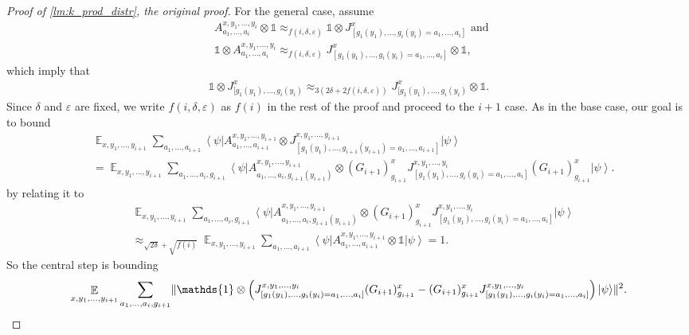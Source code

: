 \documentclass[10pt,a4paper]{article}
\theoremstyle{plain}
\theoremstyle{definition}
\DeclarePairedDelimiter{\norm}{\lVert}{\rVert}
\newcommand {\bra} [1] {\ensuremath{ \left\langle #1 \right| }}
\newcommand {\ket} [1] {\ensuremath{ \left| #1 \right\rangle }}
\DeclareMathOperator*{\bigE}{\mathbb{E}}
\newcommand {\id} {\ensuremath{\mathds{1}}}
\newcommand{\ep} {\ensuremath{\varepsilon}}
\newcommand{\x}{\otimes}
\newcommand{\appd}[1]{\approx_{#1}}
\newcommand{\1}{\mathbb{1}} %
\begin{document}
\begin{proof}[Proof of \cref{lm:k_prod_distr}, the original proof]
	For the general case, assume 
	\begin{align*}
		& A^{x,y_1,\ldots,y_i}_{a_1,\ldots,a_i} \x \id \appd{f(i,\delta,\ep)}  \id \x J^x_{[g_1(y_1), \ldots , g_i(y_i) 
		= a_1, \ldots, a_i]} \text{ and }\\
		&\id \x A^{x,y_1,\ldots,y_i}_{a_1,\ldots,a_i} \appd{f(i,\delta,\ep)}   J^x_{[g_1(y_1), \ldots , g_i(y_i) 
		= a_1, \ldots, a_i]} \x \id,
	\end{align*}
	which imply that 
	\begin{align*}
		 \id \x J^x_{[g_1(y_1), \ldots , g_i(y_i)} \appd{3( 2 \delta + 2 f(i,\delta, \ep))}  J^x_{[g_1(y_1), \ldots , g_i(y_i)} \x \id.
	\end{align*}
	Since $\delta$ and $\ep$ are fixed, we write $f(i,\delta, \ep)$ as $f(i)$ in the rest of the proof and proceed to the $i+1$ case.
	As in the base case, our goal is to bound
	\begin{align*}
		&\bigE_{x,y_1,\ldots,y_{i+1}} \sum_{a_1,\ldots, a_{i+1}} \bra{\psi} A^{x,y_1,\ldots,y_{i+1}}_{a_1,\ldots,a_{i+1}} \x J^{x,y_1,\ldots,y_{i+1}}_{[g_1(y_1),\ldots,g_{i+1}(y_{i+1}) = a_1, \ldots,a_{i+1}]} \ket{\psi} \\
		&=\bigE_{x,y_1,\ldots, y_{i+1}} \sum_{a_1, \ldots, a_i, g_{i+1} }\bra{\psi} A^{x,y_1,\ldots,y_{i+1}}_{a_1,\ldots, a_i, g_{i+1}(y_{i+1}) } \x 
		 (G_{i+1})^x_{g_{i+1}} J_{[g_1(y_1),\ldots,g_{i}(y_{i}) = a_1, \ldots,a_{i}]}^{x,y_1,\ldots,y_i}   (G_{i+1})^x_{g_{i+1}} \ket{\psi}.
	\end{align*}
	by relating it to
	\begin{align*}
		&\bigE_{x,y_1,\ldots,y_{i+1}} \sum_{a_1, \ldots, a_i, g_{i+1} }\bra{\psi} A^{x,y_1,\ldots, y_{i+1}}_{a_1,\ldots,a_i, g_{i+1}(y_{i+1}) } \x 
		 (G_{i+1})^x_{g_{i+1}}  J_{[g_1(y_1),\ldots,g_{i}(y_{i}) = a_1, \ldots,a_{i}]}^{x,y_1,\ldots,y_i} \ket{\psi}\\
		 & \appd{\sqrt{2\delta} + \sqrt{f(i)} } 
		 \bigE_{x,y_1,\ldots, y_{i+1}} \sum_{a_1, \ldots, a_{i+1}} \bra{\psi} A^{x,y_1,\ldots,y_{i+1}}_{a_1,\ldots, a_{i+1}} \x \id \ket{\psi} = 1.
	\end{align*}
	So the central step is bounding 
	\begin{align*}
		\bigE_{x,y_1,\ldots,y_{i+1}} \sum_{a_1,\ldots,a_i, g_{i+1}} \norm{ \id \x \left( J_{[g_1(y_1),\ldots,g_{i}(y_{i}) = a_1, \ldots,a_{i}]}^{x,y_1,\ldots,y_i}(G_{i+1})^x_{g_{i+1}} - (G_{i+1})^x_{g_{i+1}} J_{[g_1(y_1),\ldots,g_{i}(y_{i}) = a_1, \ldots,a_{i}]}^{x,y_1,\ldots,y_i} \right) \ket{\psi}}^2.
	\end{align*}

\end{proof}
\end{document}
